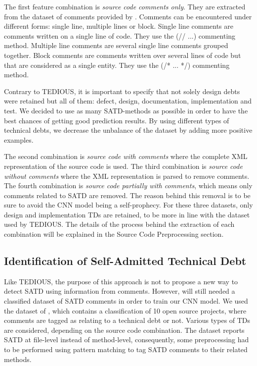 The first feature combination is \textit{source code comments only}. They are extracted from the dataset of comments provided by \citet{maldonado17}. Comments can be encountered under different forms: single line, multiple lines or block. Single line comments are comments written on a single line of code. They use the \textsc{(// ...)} commenting method. Multiple line comments are several single line comments grouped together. Block comments are comments written over several lines of code but that are considered as a single entity. They use the \textsc{(/* ... */)} commenting method.

Contrary to TEDIOUS, it is important to specify that not solely design debts were retained but all of them: defect, design, documentation, implementation and test. We decided to use as many SATD-methods as possible in order to have the best chances of getting good prediction results. By using different types of technical debts, we decrease the unbalance of the dataset by adding more positive examples.

The second combination is \textit{source code with comments} where the complete XML representation of the source code is used. The third combination is \textit{source code without comments} where the XML representation is parsed to remove comments. The fourth combination is \textit{source code partially with comments}, which means only comments related to SATD are removed. The reason behind this removal is to be sure to avoid the CNN model being a self-prophecy. For these three datasets, only design and implementation TDs are retained, to be more in line with the dataset used by TEDIOUS. The details of the process behind the extraction of each combination will be explained in the Source Code Preprocessing section.

\subsection{Identification of Self-Admitted Technical Debt}


Like TEDIOUS, the purpose of this approach is not to propose a new way to detect SATD using information from comments. However, will still needed a classified dataset of SATD comments in order to train our CNN model. We used the dataset of \citet{maldonado17}, which contains a classification of 10 open source projects, where comments are tagged as relating to a technical debt or not. Various types of TDs are considered, depending on the source code combination. The dataset reports SATD at file-level instead of method-level, consequently, some preprocessing had to be performed using pattern matching to tag SATD comments to their related methods.

